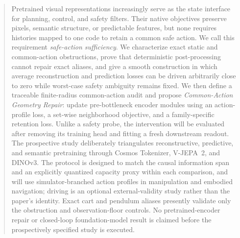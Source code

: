 \begin{abstract}
Pretrained visual representations increasingly serve as the state interface for planning, control,
and safety filters.  Their native objectives preserve pixels, semantic structure, or predictable
features, but none requires histories mapped to one code to retain a common safe action.  We call
this requirement \emph{safe-action sufficiency}.  We characterize exact static and common-action
obstructions, prove that deterministic post-processing cannot repair exact aliases, and give a
smooth construction in which average reconstruction and prediction losses can be driven
arbitrarily close to zero while worst-case safety ambiguity remains fixed.  We then define a
traceable finite-radius common-action audit and propose \emph{Common-Action Geometry Repair}: update
pre-bottleneck encoder modules using an
action-profile loss, a set-wise neighborhood objective, and a family-specific retention loss.
Unlike a safety probe, the intervention will be evaluated after removing its training head and
fitting a fresh downstream readout.  The prospective study deliberately triangulates reconstructive,
predictive, and semantic pretraining through Cosmos Tokenizer, V-JEPA~2, and DINOv3.  The protocol
is designed to match the causal information span and an explicitly quantized capacity
proxy within each comparison, and will use simulator-branched action profiles in manipulation and
embodied navigation; driving is an optional
external-validity study rather than the paper's identity.  Exact cart and pendulum aliases presently
validate only the obstruction and observation-floor controls.  No pretrained-encoder repair or
closed-loop foundation-model result is claimed before the prospectively specified study is executed.
\end{abstract}
